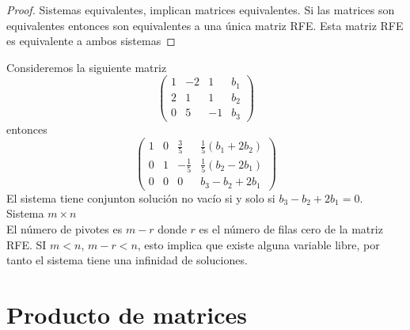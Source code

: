 \documentclass[12pt,a4paper]{book}
\newcommand{\parentesis}[1]{\left(#1\right)}
\begin{document}
    \begin{proof}
        Sistemas equivalentes, implican matrices equivalentes. Si las matrices son
        equivalentes entonces son equivalentes a una única matriz RFE. Esta matriz
        RFE es equivalente a ambos sistemas
    \end{proof}

    \begin{ejemplo}
        Consideremos la siguiente matriz
        \begin{equation*}
            \parentesis{
                \begin{array}{ccc|c}
                    1 & -2 & 1 & b_{1}\\
                    2 & 1 & 1 & b_{2}\\
                    0 & 5 & -1 & b_{3}
                \end{array}
            }
        \end{equation*}
        entonces
        \begin{equation*}
            \parentesis{
                \begin{array}{ccc|c}
                    1 & 0 & \frac{3}{5} & \frac{1}{5}(b_{1}+2b_{2})\\
                    0 & 1 & -\frac{1}{5} & \frac{1}{5}(b_{2}-2b_{1})\\
                    0 & 0 & 0 & b_{3}-b_{2}+2b_{1}
                \end{array}
            }
        \end{equation*}
        El sistema tiene conjunton solución no vacío si y solo si $b_{3}-b_{2}+2b_{1}=0$.\\
        Sistema $m\times n$\\
        El número de pivotes es $m-r$ donde $r$ es el número de filas cero de la matriz
        RFE. SI $m\lt n$, $m-r\lt n$, esto implica que existe alguna variable libre, por
        tanto el sistema tiene una infinidad de soluciones.
    \end{ejemplo}
    

    \section{Producto de matrices}
\end{document}
